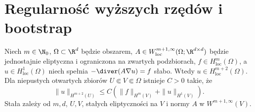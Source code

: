 \section{Regularność wyższych rzędów i bootstrap}
\label{sec:pde15-bootstrap}
\begin{twierdzenie}
\label{thm:pde15-bootstrap}
Niech $m\in\N_0$, $\Omega\subset\R^d$ będzie obszarem,
$A\in W^{m+1,\infty}_{\mathrm{loc}}(\Omega;\R^{d\times d})$
będzie jednostajnie eliptyczna i ograniczona na zwartych
podzbiorach, $f\in H^m_{\mathrm{loc}}(\Omega)$,
a $u\in H^1_{\mathrm{loc}}(\Omega)$ niech spełnia
$-\diver(A\nabla u)=f$ słabo. Wtedy
$u\in H^{m+2}_{\mathrm{loc}}(\Omega)$.
Dla niepustych otwartych zbiorów $U\Subset V\Subset\Omega$
istnieje $C>0$ takie, że
\[
 \|u\|_{H^{m+2}(U)}
 \le C(\|f\|_{H^m(V)}+\|u\|_{H^1(V)}).
\]
Stała zależy od $m,d$, $U,V$, stałych eliptyczności na $V$
i normy $A$ w $W^{m+1,\infty}(V)$.
\end{twierdzenie}
